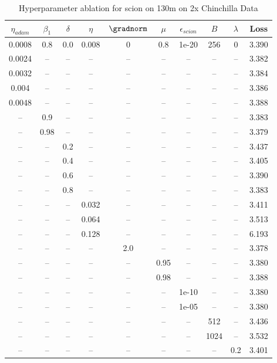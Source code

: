 \begin{table}[h!]
\centering
\caption{Hyperparameter ablation for scion on 130m on 2x Chinchilla Data}
\label{tab:ablation_scion_130m_on_2x_chinchilla_data}
\begin{tabular}{cccccccccc}
\toprule
$\eta_{adam}$ & $\beta_1$ & $\delta$ & $\eta$ & $\gradnorm$ & $\mu$ & $\epsilon_{scion}$ & $B$ & $\lambda$ & Loss \\
\midrule
0.0008 & 0.8 & 0.0 & 0.008 & 0 & 0.8 & 1e-20 & 256 & 0 & 3.390 \\
\midrule
0.0024 & -- & -- & -- & -- & -- & -- & -- & -- & 3.382 \\
0.0032 & -- & -- & -- & -- & -- & -- & -- & -- & 3.384 \\
0.004 & -- & -- & -- & -- & -- & -- & -- & -- & 3.386 \\
0.0048 & -- & -- & -- & -- & -- & -- & -- & -- & 3.388 \\
-- & 0.9 & -- & -- & -- & -- & -- & -- & -- & 3.383 \\
-- & 0.98 & -- & -- & -- & -- & -- & -- & -- & 3.379 \\
-- & -- & 0.2 & -- & -- & -- & -- & -- & -- & 3.437 \\
-- & -- & 0.4 & -- & -- & -- & -- & -- & -- & 3.405 \\
-- & -- & 0.6 & -- & -- & -- & -- & -- & -- & 3.390 \\
-- & -- & 0.8 & -- & -- & -- & -- & -- & -- & 3.383 \\
-- & -- & -- & 0.032 & -- & -- & -- & -- & -- & 3.411 \\
-- & -- & -- & 0.064 & -- & -- & -- & -- & -- & 3.513 \\
-- & -- & -- & 0.128 & -- & -- & -- & -- & -- & 6.193 \\
-- & -- & -- & -- & 2.0 & -- & -- & -- & -- & 3.378 \\
-- & -- & -- & -- & -- & 0.95 & -- & -- & -- & 3.380 \\
-- & -- & -- & -- & -- & 0.98 & -- & -- & -- & 3.388 \\
-- & -- & -- & -- & -- & -- & 1e-10 & -- & -- & 3.380 \\
-- & -- & -- & -- & -- & -- & 1e-05 & -- & -- & 3.380 \\
-- & -- & -- & -- & -- & -- & -- & 512 & -- & 3.436 \\
-- & -- & -- & -- & -- & -- & -- & 1024 & -- & 3.532 \\
-- & -- & -- & -- & -- & -- & -- & -- & 0.2 & 3.401 \\
\bottomrule
\end{tabular}
\end{table}

